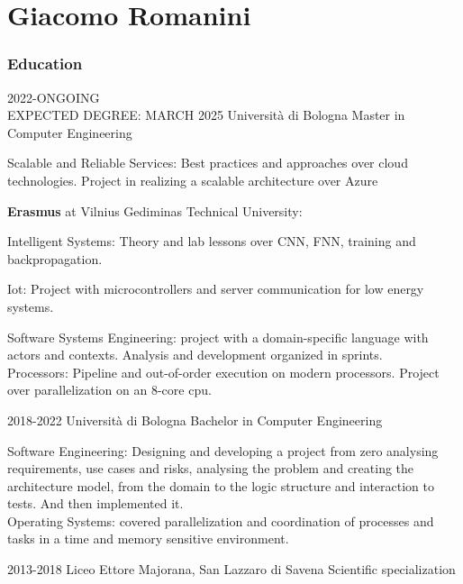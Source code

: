 \documentclass{tccv}
\begin{document}
\part{Giacomo Romanini}


\section{Education}

\hfill

\begin{eventlist}

    \item{2022-ONGOING\\EXPECTED DEGREE: MARCH 2025}
          {Università di Bologna}
          {Master in Computer Engineering}

    Scalable and Reliable Services: Best practices and approaches over cloud technologies. Project in realizing a scalable architecture over Azure

    \textbf{Erasmus} at Vilnius Gediminas Technical University:

    \quad Intelligent Systems: Theory and lab lessons over CNN, FNN, training and backpropagation.

    \quad Iot: Project with microcontrollers and server communication for low energy systems.
    
    Software Systems Engineering: project with a domain-specific language with actors and contexts. Analysis and development organized in sprints.\\
    Processors: Pipeline and out-of-order execution on modern processors. Project over parallelization on an 8-core cpu.

    \item{2018-2022}
          {Università di Bologna}
          {Bachelor in Computer Engineering}

    Software Engineering: Designing and developing a project from zero analysing requirements, use cases and risks, analysing the problem and creating the architecture model, from the domain to the logic structure and interaction to tests. And then implemented it.\\
    Operating Systems: covered parallelization and coordination of processes and tasks in a time and memory sensitive environment.

    \item{2013-2018}
          {Liceo Ettore Majorana, San Lazzaro di Savena}
          {Scientific specialization}
\end{eventlist}
\end{document}
